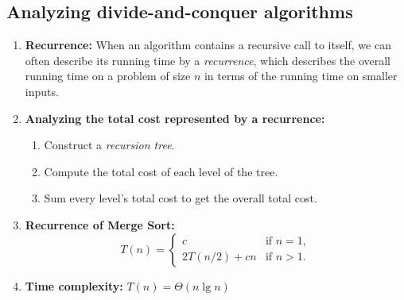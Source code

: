 \documentclass{report}
\begin{document}
\subsection{Analyzing divide-and-conquer algorithms}
\begin{enumerate}
    \item \textbf{Recurrence:} When an algorithm contains a recursive call to itself, we can often describe its running time by a \emph{recurrence}, which describes the overall running time on a problem of size $n$ in terms of the running time on smaller inputs.
    \item \textbf{Analyzing the total cost represented by a recurrence:}
    \begin{enumerate}
        \item Construct a \emph{recursion tree}.
        \item Compute the total cost of each level of the tree.
        \item Sum every level's total cost to get the overall total cost.
    \end{enumerate}
    \item \textbf{Recurrence of Merge Sort:} 
    $$
    T(n) = 
    \begin{cases}
        c            & \text{if } n = 1, \\ %
        2T(n/2) + cn & \text{if } n > 1.
    \end{cases}
    $$
    \item \textbf{Time complexity:} $T(n) = \Theta(n\lg{n})$
\end{enumerate}
\end{document}
